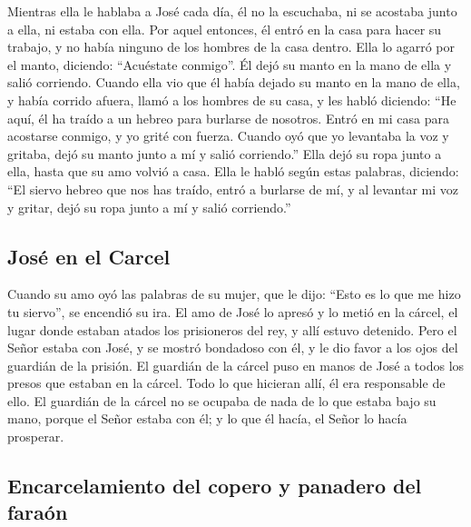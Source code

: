  Mientras ella le hablaba a José cada día, él no la
escuchaba, ni se acostaba junto a ella, ni estaba con ella.
 Por aquel entonces, él entró en la casa para hacer su
trabajo, y no había ninguno de los hombres de la casa dentro.
 Ella lo agarró por el manto, diciendo: ``Acuéstate
conmigo''. Él dejó su manto en la mano de ella y salió corriendo.
 Cuando ella vio que él había dejado su manto en la mano
de ella, y había corrido afuera,  llamó a los hombres de
su casa, y les habló diciendo: ``He aquí, él ha traído a un hebreo para
burlarse de nosotros. Entró en mi casa para acostarse conmigo, y yo
grité con fuerza.  Cuando oyó que yo levantaba la voz y
gritaba, dejó su manto junto a mí y salió corriendo.'' 
Ella dejó su ropa junto a ella, hasta que su amo volvió a casa.
 Ella le habló según estas palabras, diciendo: ``El
siervo hebreo que nos has traído, entró a burlarse de mí,
 y al levantar mi voz y gritar, dejó su ropa junto a mí y
salió corriendo.''

\hypertarget{josuxe9-en-el-carcel}{%
\subsection{José en el Carcel}\label{josuxe9-en-el-carcel}}

 Cuando su amo oyó las palabras de su mujer, que le dijo:
``Esto es lo que me hizo tu siervo'', se encendió su ira.
 El amo de José lo apresó y lo metió en la cárcel, el
lugar donde estaban atados los prisioneros del rey, y allí estuvo
detenido.  Pero el Señor estaba con José, y se mostró
bondadoso con él, y le dio favor a los ojos del guardián de la prisión.
 El guardián de la cárcel puso en manos de José a todos
los presos que estaban en la cárcel. Todo lo que hicieran allí, él era
responsable de ello.  El guardián de la cárcel no se
ocupaba de nada de lo que estaba bajo su mano, porque el Señor estaba
con él; y lo que él hacía, el Señor lo hacía prosperar.

\hypertarget{encarcelamiento-del-copero-y-panadero-del-farauxf3n}{%
\subsection{Encarcelamiento del copero y panadero del
faraón}\label{encarcelamiento-del-copero-y-panadero-del-farauxf3n}}

